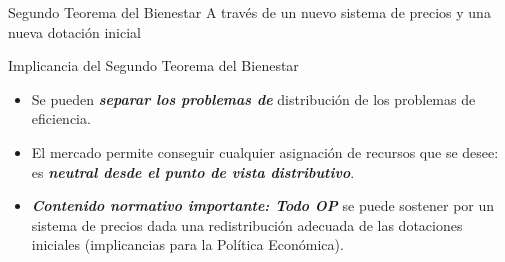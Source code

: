 \begin{frame}{Segundo Teorema del Bienestar}
A través de un nuevo sistema de precios y una nueva dotación inicial
	\begin{center}
		
	\end{center}
\end{frame}
\begin{frame}{Implicancia del Segundo Teorema del Bienestar}
	\begin{itemize}
		\item Se pueden \textbf{\textit{separar los problemas de}} distribución de los problemas de eficiencia.
		
		\item El mercado permite conseguir cualquier asignación de recursos que se desee: es \textbf{\textit{neutral desde el punto de vista distributivo}}.
		
		\item \textbf{\textit{Contenido normativo importante: Todo OP}} se puede sostener por un sistema de precios dada una redistribución adecuada de las dotaciones iniciales (implicancias para la Política Económica).
	\end{itemize}
\end{frame}